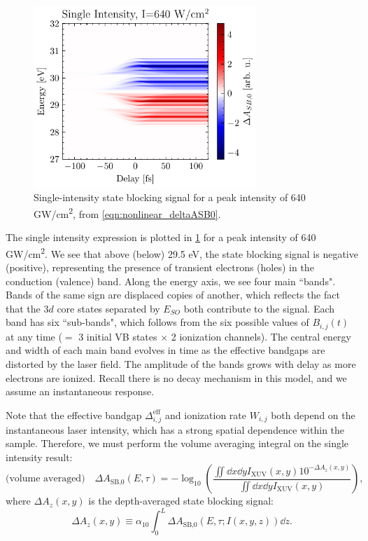 \begin{figure}
	\centering
	\includegraphics[width=0.75\textwidth]{figures/chap4/dASB0_1430nm_640GWcm2.pdf}
	\caption{Single-intensity state blocking signal for a peak intensity of 640 GW/cm\textsuperscript{2}, from \cref{eqn:nonlinear_deltaASB0}.}
	\label{fig:dASB0_1430nm_640GWcm2}
\end{figure}

The single intensity expression is plotted in \cref{fig:dASB0_1430nm_640GWcm2} for a peak intensity of 640 GW/cm\textsuperscript{2}. We see that above (below) 29.5 eV, the state blocking signal is negative (positive), representing the presence of transient electrons (holes) in the conduction (valence) band. Along the energy axis, we see four main ``bands". Bands of the same sign are displaced copies of another, which reflects the fact that the $3d$ core states separated by $E_{SO}$ both contribute to the signal. Each band has six ``sub-bands", which follows from the six possible values of $B_{i,j}(t)$ at any time ($=$ 3 initial VB states $\times$ 2 ionization channels). The central energy and width of each main band evolves in time as the effective bandgaps are distorted by the laser field. The amplitude of the bands grows with delay as more electrons are ionized. Recall there is no decay mechanism in this model, and we assume an instantaneous response.

Note that the effective bandgap $\Delta_{i,j}^{\textrm{eff}}$ and ionization rate $W_{i,j}$ both depend on the instantaneous laser intensity, which has a strong spatial dependence within the sample. Therefore, we must perform the volume averaging integral on the single intensity result:
\begin{equation}
\label{eqn:Delta_A_5}
\textrm{(volume averaged)} \quad \Delta A_{\textrm{SB,0}}(E,\tau) = -\log_{10} \left( \frac{ \iint \dd{x} \dd{y} I_{\textrm{XUV}}(x,y) 10^{-\Delta A_z(x,y)}}{ \iint \dd{x} \dd{y} I_{\textrm{XUV}}(x,y)} \right),
\end{equation}
where $\Delta A_z(x,y)$ is the depth-averaged state blocking signal:
\begin{equation}
\Delta A_z(x,y) \equiv  \alpha_{10} \int_{0}^{L} \Delta A_{\textrm{SB,0}}(E,\tau; I(x,y,z)) \dd{z}.
\end{equation}

